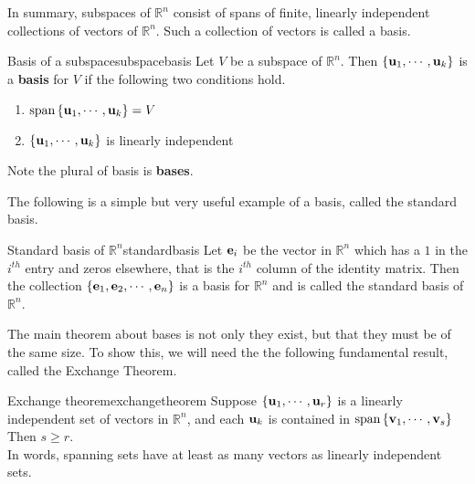 In summary, subspaces of $\mathbb{R}^{n}$ consist of spans of finite,
linearly independent collections of vectors of $\mathbb{R}^{n}$.  Such
a collection of vectors is called a basis.

\begin{definition}{Basis of a subspace}{subspacebasis}
Let $V$ be a subspace of $\mathbb{R}^{n}$. Then $\left\{
{\bf u}_{1},\cdots ,{\bf u}_{k}\right\} $ is a \textbf{basis} for $V$ if the following two conditions hold.

\begin{enumerate}
\item $\mbox{span}\left\{ {\bf u}_{1},\cdots ,{\bf u}_{k}\right\} =V$
\item $\left\{ {\bf u}_{1},\cdots ,{\bf u}_{k}\right\} $ is linearly
independent
\end{enumerate}

Note the plural of basis is \textbf{bases}. 
\end{definition}

The following is a simple but very useful example of a basis, called the standard basis.

\begin{definition}{Standard basis of $\mathbb{R}^n$}{standardbasis}
Let ${\bf e}_i$ be the vector in $\mathbb{R}^n$ which has a $1$ in the $i^{th}$ entry and zeros elsewhere, that is the $i^{th}$ column of the identity matrix. Then the collection $\left\{{\bf e}_1, {\bf e}_2, \cdots, {\bf e}_n
\right\}$ is a basis for
$\mathbb{R}^n$ and is called the standard basis of $\mathbb{R}^n$.
\end{definition}

The main theorem about bases is not only they exist, but that they
must be of the same size. To show this, we will need the the following
fundamental result, called the Exchange Theorem.

\begin{theorem}{Exchange theorem}{exchangetheorem}
Suppose $\left\{ {\bf u}_{1},\cdots ,{\bf u}_{r}\right\} $ is a
linearly independent set of vectors in $\mathbb{R}^n$, and each
${\bf u}_{k}$ is contained in $\mbox{span}\left\{ {\bf v}_{1},\cdots
,{\bf v}_{s}\right\}$ Then $s\geq r.$ \\
In words, spanning sets have at least as many vectors as linearly
independent sets.
\end{theorem}

